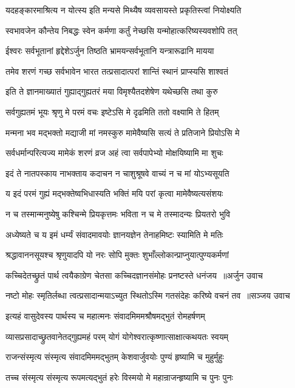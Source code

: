 \twolineshloka
{यदहङ्कारमाश्रित्य न योत्स्य इति मन्यसे}
{मिथ्यैष व्यवसायस्ते प्रकृतिस्त्वां नियोक्ष्यति}


\twolineshloka
{स्वभावजेन कौन्तेय निबद्धः स्वेन कर्मणा}
{कर्तुं नेच्छसि यन्मोहात्करिष्यस्यवशोपि तत्}


\twolineshloka
{ईश्वरः सर्वभूतानां हृद्देशेऽर्जुन तिष्ठति}
{भ्रामयन्सर्वभूतानि यन्त्रारूढानि मायया}


\twolineshloka
{तमेव शरणं गच्छ सर्वभावेन भारत}
{तत्प्रसादात्परां शान्तिं स्थानं प्राप्स्यसि शाश्वतं}


\twolineshloka
{इति ते ज्ञानमाख्यातं गुह्याद्गुह्यतरं मया}
{विमृश्यैतदशेषेण यथेच्छसि तथा कुरु}


\twolineshloka
{सर्वगुह्यतमं भूयः श्रृणु मे परमं वचः}
{इष्टेऽसि मे दृढमिति ततो वक्ष्यामि ते हितम्}


\twolineshloka
{मन्मना भव मद्भक्तो मद्याजी मां नमस्कुरु}
{मामेवैष्यसि सत्यं ते प्रतिजाने प्रियोऽसि मे}


\twolineshloka
{सर्वधर्मान्परित्यज्य मामेकं शरणं व्रज}
{अहं त्वा सर्वपापेभ्यो मोक्षयिष्यामि मा शुचः}


\twolineshloka
{इदं ते नातपस्काय नाभक्ताय कदाचन}
{न चाशुश्रूषवे वाच्यं न च मां योऽभ्यसूयति}


\twolineshloka
{य इदं परमं गुह्यं मद्भक्तेष्वभिधास्यति}
{भक्तिं मयि परां कृत्वा मामेवैष्यत्यसंशयः}


\twolineshloka
{न च तस्मान्मनुष्येषु कश्चिन्मे प्रियकृत्तमः}
{भविता न च मे तस्मादन्यः प्रियतरो भुवि}


\twolineshloka
{अध्येष्यते च य इमं धर्म्यं संवादमावयोः}
{ज्ञानयज्ञेन तेनाहमिष्टः स्यामिति मे मतिः}


\twolineshloka
{श्रद्धावाननसूयश्च श्रृणुयादपि यो नरः}
{सोपि मुक्तः शुभाँल्लोकान्प्राप्नुयात्पुण्यकर्मणां}


\threelineshloka
{कच्चिदेतच्छ्रुतं पार्थ त्वयैकाग्रेण चेतसा}
{कच्चिदज्ञानसंमोहः प्रनष्टस्ते धनंजय ॥अर्जुन उवाच}
{}


\threelineshloka
{नष्टो मोहः स्मृतिर्लब्धा त्वत्प्रसादान्मयाऽच्युत}
{स्थितोऽस्मि गतसंदेहः करिष्ये वचनं तव ॥सञ्जय उवाच}
{}


\twolineshloka
{इत्यहं वासुदेवस्य पार्थस्य च महात्मनः}
{संवादमिममश्रौषमद्भुतं रोमहर्षणम्}


\twolineshloka
{व्यासप्रसादाच्छ्रुतवानेतद्गुह्यमहं परम्}
{योगं योगेश्वरात्कृष्णात्साक्षात्कथयतः स्वयम्}


\twolineshloka
{राजन्संस्मृत्य संस्मृत्य संवादमिममद्भुतम्}
{केशवार्जुवयोः पुण्यं हृष्यामि च मुहुर्मुहुः}


\twolineshloka
{तच्च संस्मृत्य संस्मृत्य रूपमत्यद्भुतं हरेः}
{विस्मयो मे महान्राजन्हृष्यामि च पुनः पुनः}


